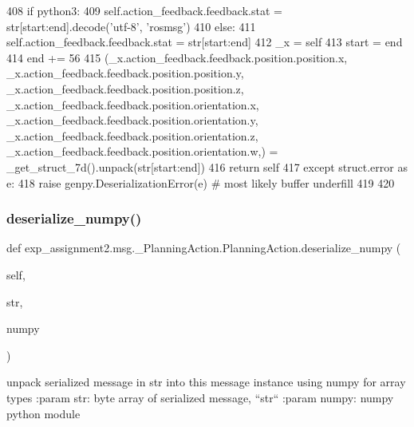 \begin{DoxyCode}
408       \textcolor{keywordflow}{if} python3:
409         self.action\_feedback.feedback.stat = str[start:end].decode(\textcolor{stringliteral}{'utf-8'}, \textcolor{stringliteral}{'rosmsg'})
410       \textcolor{keywordflow}{else}:
411         self.action\_feedback.feedback.stat = str[start:end]
412       \_x = self
413       start = end
414       end += 56
415       (\_x.action\_feedback.feedback.position.position.x, \_x.action\_feedback.feedback.position.position.y, 
      \_x.action\_feedback.feedback.position.position.z, \_x.action\_feedback.feedback.position.orientation.x, 
      \_x.action\_feedback.feedback.position.orientation.y, \_x.action\_feedback.feedback.position.orientation.z, 
      \_x.action\_feedback.feedback.position.orientation.w,) = \_get\_struct\_7d().unpack(str[start:end])
416       \textcolor{keywordflow}{return} self
417     \textcolor{keywordflow}{except} struct.error \textcolor{keyword}{as} e:
418       \textcolor{keywordflow}{raise} genpy.DeserializationError(e)  \textcolor{comment}{# most likely buffer underfill}
419 
420 
\end{DoxyCode}
\mbox{\label{classexp__assignment2_1_1msg_1_1__PlanningAction_1_1PlanningAction_ab9e79157787c279e2a8b8427db148ed1}} 
\subsubsection{\texorpdfstring{deserialize\+\_\+numpy()}{deserialize\_numpy()}}
{\footnotesize\ttfamily def exp\+\_\+assignment2.\+msg.\+\_\+\+Planning\+Action.\+Planning\+Action.\+deserialize\+\_\+numpy (\begin{DoxyParamCaption}\item[{}]{self,  }\item[{}]{str,  }\item[{}]{numpy }\end{DoxyParamCaption})}

\begin{DoxyVerb}unpack serialized message in str into this message instance using numpy for array types
:param str: byte array of serialized message, ``str``
:param numpy: numpy python module
\end{DoxyVerb}
 

